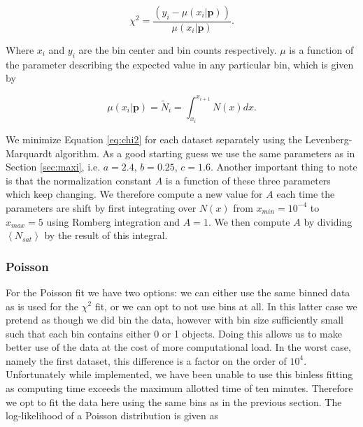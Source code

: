 \begin{equation}
    \chi^2 = \frac{\left(y_i - \mu(x_i | \boldsymbol{p})\right)}{\mu(x_i | \boldsymbol{p})}.\label{eq:chi2}
\end{equation}

Where $x_i$ and $y_i$ are the bin center and bin counts respectively. $\mu$ is a function of the parameter describing the expected value in any particular bin, which is given by

\begin{equation}
    \mu\left(x_i | \boldsymbol{p}\right) = \tilde N_i = \int_{x_i}^{x_{i+1}} N(x)dx.\label{eq:mean}
\end{equation}

We minimize Equation \ref{eq:chi2} for each dataset separately using the Levenberg-Marquardt algorithm. As a good starting guess we use the same parameters as in Section \ref{sec:maxi}, i.e. $a=2.4$, $b=0.25$, $c=1.6$. Another important thing to note is that the normalization constant $A$ is a function of these three parameters which keep changing. We therefore compute a new value for $A$ each time the parameters are shift by first integrating over $N(x)$ from $x_{min}=10^{-4}$ to $x_{max}=5$ using Romberg integration and $A=1$. We then compute $A$ by dividing $\left<N_{sat}\right>$ by the result of this integral.




\subsubsection{Poisson}

For the Poisson fit we have two options: we can either use the same binned data as is used for the $\chi^2$ fit, or we can opt to not use bins at all. In this latter case we pretend as though we did bin the data, however with bin size sufficiently small such that each bin contains either 0 or 1 objects. Doing this allows us to make better use of the data at the cost of more computational load. In the worst case, namely the first dataset, this difference is a factor on the order of $10^4$. Unfortunately while implemented, we have been unable to use this binless fitting as computing time exceeds the maximum allotted time of ten minutes. Therefore we opt to fit the data here using the same bins as in the previous section. The log-likelihood of a Poisson distribution is given as


